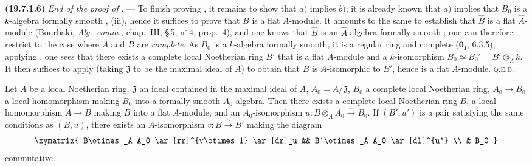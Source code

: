 \medskip
\noindent\textbf{(19.7.1.6)}\enspace
\emph{End of the proof of} . ---
To finish proving , it remains to show that $a)$ implies $b)$; it is already known that $a)$ implies that $B_0$ is a $k$-algebra formally smooth , (iii), hence it suffices to prove that $B$ is a flat $A$-module.
It amounts to the same to establish that $\widehat{B}$ is a flat $\widehat{A}$-module (Bourbaki, \emph{Alg.\ comm.}, chap.~III, \S\,5, n$^\circ$\,4, prop.~4), and one knows that $\widehat{B}$ is an $\widehat{A}$-algebra formally smooth ; one can therefore restrict to the case where $A$ and $B$ are \emph{complete}.
As $B_0$ is a $k$-algebra formally smooth, it is a regular ring  and complete ($\mathbf{0_I}$, 6.3.5); applying , one sees that there exists a complete local Noetherian ring $B'$ that is a flat $A$-module and a $k$-isomorphism $B_0\simeq B_0'=B'\otimes_A k$.
It then suffices to apply  (taking $\mathfrak{J}$ to be the maximal ideal of $A$) to obtain that $B$ is $A$-isomorphic to $B'$, hence is a flat $A$-module. \textsc{q.e.d.}

\begin{theorem}[19.7.2]
\label{0.19.7.2}
Let $A$ be a local Noetherian ring, $\mathfrak{J}$ an ideal contained in the maximal ideal of $A$, $A_0=A/\mathfrak{J}$, $B_0$ a complete local Noetherian ring, $A_0\to B_0$ a local homomorphism making $B_0$ into a formally smooth $A_0$-algebra.
Then there exists a complete local Noetherian ring $B$, a local homomorphism $A\to B$ making $B$ into a flat $A$-module, and an $A_0$-isomorphism $u:B\otimes_A A_0\xrightarrow{\sim} B_0$.
If $(B',u')$ is a pair satisfying the same conditions as $(B,u)$, there exists an $A$-isomorphism $v:B\xrightarrow{\sim} B'$ making the diagram
\[
\xymatrix{
  B\otimes_A A_0 \ar[rr]^{v\otimes 1} \ar[dr]_u && B'\otimes_A A_0 \ar[dl]^{u'} \\
  & B_0
}
\]
commutative.
\end{theorem}


